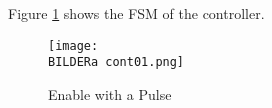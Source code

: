 
Figure \ref{fig:asCont01} shows the FSM of the controller.
\begin{figure}[H] 
\centering
  \texttt{[image: \\BILDERa cont01.png]}
\caption{Enable with a Pulse}
\label{fig:asCont01}
\end{figure}
